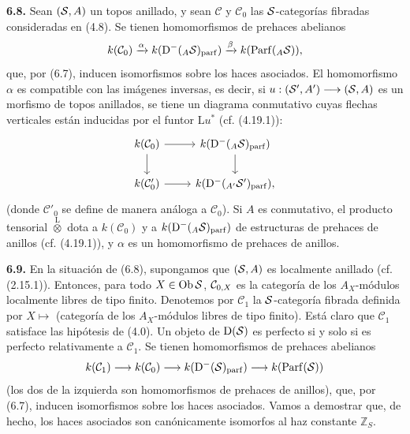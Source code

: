\textbf{6.8.} Sean \((\sisi{S}{\mathcal S},A)\) un topos anillado, y sean \(\mathcal C\) y \(\mathcal C_0\) las \(\sisi{S}{\mathcal S}\)-categorías fibradas consideradas en (4.8). Se tienen homomorfismos de prehaces abelianos
\[
  k(\mathcal C_0)
  \xrightarrow{\alpha}
  k(\Dpx^-({}_A \sisi{S}{\mathcal S})_{\mathrm{parf}})
  \xrightarrow{\beta}
  k(\Parf({}_A \sisi{S}{\mathcal S})),
\]
que, por (6.7), inducen isomorfismos sobre los haces asociados. El homomorfismo \(\alpha\) es compatible con las imágenes inversas, es decir, si \(u:(\sisi{S'}{\mathcal S'},A')\longrightarrow(\sisi{S}{\mathcal S},A)\) es un morfismo de topos anillados, se tiene un diagrama conmutativo cuyas flechas verticales están inducidas por el funtor \(\mathrm L u^*\) (cf. (4.19.1)):
\[
\begin{tikzcd}
 k(\mathcal C_0) \arrow[r] \arrow[d] & k(\Dpx^-({}_A \sisi{S}{\mathcal S})_{\mathrm{parf}}) \arrow[d]\\
 k(\mathcal C'_0) \arrow[r] & k(\Dpx^-({}_{A'} \sisi{S'}{\mathcal S'})_{\mathrm{parf}}),
\end{tikzcd}
\]
(donde \(\mathcal C'_0\) se define de manera análoga a \(\mathcal C_0\)). Si \(A\) es conmutativo, el producto tensorial \(\overset{\mathrm L}{\otimes}\) dota a \(k(\mathcal C_0)\) y a \(k(\Dpx^-({}_A \sisi{S}{\mathcal S})_{\mathrm{parf}})\) de estructuras de prehaces de anillos (cf. (4.19.1)), y \(\alpha\) es un homomorfismo de prehaces de anillos.

\textbf{6.9.} En la situación de (6.8), supongamos que \((\sisi{S}{\mathcal S},A)\) es localmente anillado (cf. (2.15.1)). Entonces,  para todo \(X\in\Ob \sisi{S}{\mathcal S}\), \(\sisi{\mathcal C_{0X}}{\mathcal C_{0,X}}\) es la categoría de los \(A_X\)-módulos localmente libres de tipo finito. Denotemos por \(\mathcal C_1\) la \(\sisi{S}{\mathcal S}\)-categoría fibrada definida por \(X\longmapsto\) (categoría de los \(A_X\)-módulos libres de tipo finito). Está claro que \(\mathcal C_1\) satisface las hipótesis de (4.0). Un objeto de \(\Dpx(\sisi{S}{\mathcal S})\) es perfecto si y solo si es perfecto relativamente a \(\mathcal C_1\). Se tienen homomorfismos de prehaces abelianos
\[
  k(\mathcal C_1)\longrightarrow k(\mathcal C_0)\longrightarrow
  k(\Dpx^-(\sisi{S}{\mathcal S})_{\mathrm{parf}})\longrightarrow k(\Parf(\sisi{S}{\mathcal S}))
\]
(los dos de la izquierda son homomorfismos de prehaces de anillos), que, por (6.7), inducen isomorfismos sobre los haces asociados. Vamos a demostrar que, de hecho, los haces asociados son canónicamente isomorfos al haz constante \(\mathbb Z_S\).
